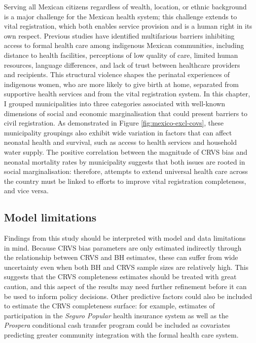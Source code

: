 \documentclass[
]{report}
\begin{document}
Serving all Mexican citizens regardless of wealth, location, or ethnic background is a major challenge for the Mexican health system;\autocite{Frenk2006} this challenge extends to vital registration, which both enables service provision and is a human right in its own respect. Previous studies have identified multifarious barriers inhibiting access to formal health care among indigenous Mexican communities, including distance to health facilities, perceptions of low quality of care, limited human resources, language differences, and lack of trust between healthcare providers and recipients.\autocite{Gamlin2020,Paulino2019} This structural violence shapes the perinatal experiences of indigenous women, who are more likely to give birth at home, separated from supportive health services and from the vital registration system.\autocite{Enciso2017,Luis2014,Hernandez2012} In this chapter, I grouped municipalities into three categories associated with well-known dimensions of social and economic marginalisation that could present barriers to civil registration. As demonstrated in Figure \ref{fig:mexico-excl-covs}, these municipality groupings also exhibit wide variation in factors that can affect neonatal health and survival, such as access to health services and household water supply. The positive correlation between the magnitude of CRVS bias and neonatal mortality rates by municipality suggests that both issues are rooted in social marginalisation: therefore, attempts to extend universal health care across the country must be linked to efforts to improve vital registration completeness, and vice versa.

\hypertarget{model-limitations}{%
\subsection{Model limitations}\label{model-limitations}}

Findings from this study should be interpreted with model and data limitations in mind. Because CRVS bias parameters are only estimated indirectly through the relationship between CRVS and BH estimates, these can suffer from wide uncertainty even when both BH and CRVS sample sizes are relatively high. This suggests that the CRVS completeness estimates should be treated with great caution, and this aspect of the results may need further refinement before it can be used to inform policy decisions. Other predictive factors could also be included to estimate the CRVS completeness surface: for example, estimates of participation in the \emph{Seguro Popular} health insurance system as well as the \emph{Prospera} conditional cash transfer program could be included as covariates predicting greater community integration with the formal health care system.
\end{document}
